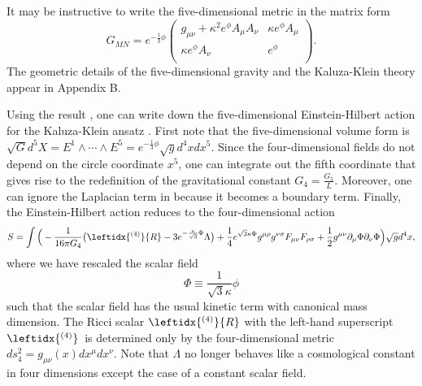 \documentclass[12pt,epsf]{article}
\begin{document}
It may be instructive to write the five-dimensional metric in the matrix form
\begin{equation}\label{5-matrix}
G_{MN} = e^{-\frac{1}{3} \phi} \left(
           \begin{array}{cc}
             g_{\mu\nu} + \kappa^2  e^\phi A_\mu A_\nu  &  \kappa e^\phi A_\mu \\
             \kappa  e^\phi A_\nu & e^\phi \\
           \end{array}
         \right).
\end{equation}
The geometric details of the five-dimensional gravity and the Kaluza-Klein theory appear in Appendix B.





Using the result , one can write down the five-dimensional Einstein-Hilbert action 
for the Kaluza-Klein ansatz .
First note that the five-dimensional volume form is $\sqrt{G} d^5 X = E^1 \wedge \cdots \wedge E^5
= e^{-\frac{1}{3}\phi} \sqrt{g} d^4 x dx^5$. Since the four-dimensional fields do not depend on the circle coordinate $x^5$,
one can integrate out the fifth coordinate that gives rise to the redefinition of the gravitational constant $G_4 = \frac{G_5}{L}$.
Moreover, one can ignore the Laplacian term in  because it becomes a boundary term.
Finally, the Einstein-Hilbert action  reduces to the four-dimensional action
\begin{equation}\label{kk-ehaction}
  S = \int \Big( - \frac{1}{16 \pi G_4} \big( \leftidx{^{(4)}}{R} - 3 e^{- \frac{\kappa}{\sqrt{3}} \Phi} \Lambda \big)
  + \frac{1}{4} e^{\sqrt{3} \kappa \Phi} g^{\mu\rho} g^{\nu\sigma} F_{\mu\nu} F_{\rho\sigma}
  + \frac{1}{2} g^{\mu\nu} \partial_\mu \Phi \partial_\nu \Phi \Big) \sqrt{g} d^4 x,
\end{equation}
where we have rescaled the scalar field
\begin{equation}\label{res-phi}
  \Phi \equiv \frac{1}{\sqrt{3} \kappa} \phi
\end{equation}
such that the scalar field has the usual kinetic term with canonical mass dimension.
The Ricci scalar $\leftidx{^{(4)}}{R}$ with the left-hand superscript $\leftidx{^{(4)}} \,$ is determined
only by the four-dimensional metric $ds_4^2 = g_{\mu\nu} (x) dx^\mu dx^\nu$.
Note that $\Lambda$ no longer behaves like a cosmological constant in four dimensions
except the case of a constant scalar field.
\end{document}
